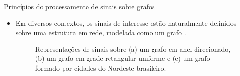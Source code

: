 \documentclass[10pt,compress]{beamer}
\newcommand{\colorcite}[1]{{\color{mygray}#1}}
\begin{document}
\begin{frame}{Princ\'ipios do processamento de sinais sobre grafos}
\begin{itemize}
\item Em diversos contextos, os sinais de interesse est\~ao naturalmente definidos sobre uma estrutura em rede, modelada como um grafo \colorcite{\cite{alam2015toward,nguyen2014compression,goldsberry2017brain,leonardi2013tight}}.

\vspace{-0.1\textheight}
\begin{figure}
\centering
{}
%
%
\caption{Representa\c{c}\~oes de sinais sobre (a) um grafo em anel direcionado, (b) um grafo em grade retangular uniforme  e (c) um grafo formado por cidades do Nordeste brasileiro.}%
\label{fig:graphs}%
\end{figure}
\end{itemize}
\end{frame}
\end{document}
